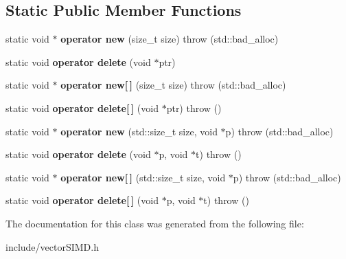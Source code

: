 \subsection*{Static Public Member Functions}
\begin{DoxyCompactItemize}
\item 
static void $\ast$ {\bfseries operator new} (size\+\_\+t size)  throw (std\+::bad\+\_\+alloc)\hypertarget{classirr_1_1vectorSIMD__32_ac2c4814f4eb148a1d2e183a49ad48ad5}{}\label{classirr_1_1vectorSIMD__32_ac2c4814f4eb148a1d2e183a49ad48ad5}

\item 
static void {\bfseries operator delete} (void $\ast$ptr)\hypertarget{classirr_1_1vectorSIMD__32_a81ff00e9b2272f5858f18e33ac8b9ce5}{}\label{classirr_1_1vectorSIMD__32_a81ff00e9b2272f5858f18e33ac8b9ce5}

\item 
static void $\ast$ {\bfseries operator new\mbox{[}$\,$\mbox{]}} (size\+\_\+t size)  throw (std\+::bad\+\_\+alloc)\hypertarget{classirr_1_1vectorSIMD__32_afa5efa80c3bb9ba2c14a90650ead879a}{}\label{classirr_1_1vectorSIMD__32_afa5efa80c3bb9ba2c14a90650ead879a}

\item 
static void {\bfseries operator delete\mbox{[}$\,$\mbox{]}} (void $\ast$ptr)  throw ()\hypertarget{classirr_1_1vectorSIMD__32_a72a9291aebc6a84f8a6895fa43eaef78}{}\label{classirr_1_1vectorSIMD__32_a72a9291aebc6a84f8a6895fa43eaef78}

\item 
static void $\ast$ {\bfseries operator new} (std\+::size\+\_\+t size, void $\ast$p)  throw (std\+::bad\+\_\+alloc)\hypertarget{classirr_1_1vectorSIMD__32_a87518dd22c99a94a59bee73916bc2db8}{}\label{classirr_1_1vectorSIMD__32_a87518dd22c99a94a59bee73916bc2db8}

\item 
static void {\bfseries operator delete} (void $\ast$p, void $\ast$t)  throw ()\hypertarget{classirr_1_1vectorSIMD__32_a06447e0f88ed49bf678551a7f0d1bf8b}{}\label{classirr_1_1vectorSIMD__32_a06447e0f88ed49bf678551a7f0d1bf8b}

\item 
static void $\ast$ {\bfseries operator new\mbox{[}$\,$\mbox{]}} (std\+::size\+\_\+t size, void $\ast$p)  throw (std\+::bad\+\_\+alloc)\hypertarget{classirr_1_1vectorSIMD__32_aa6cad6ffc6eb785db1526d07d1e3d5c3}{}\label{classirr_1_1vectorSIMD__32_aa6cad6ffc6eb785db1526d07d1e3d5c3}

\item 
static void {\bfseries operator delete\mbox{[}$\,$\mbox{]}} (void $\ast$p, void $\ast$t)  throw ()\hypertarget{classirr_1_1vectorSIMD__32_afaef82ecdf98763726424f5861692f51}{}\label{classirr_1_1vectorSIMD__32_afaef82ecdf98763726424f5861692f51}

\end{DoxyCompactItemize}


The documentation for this class was generated from the following file\+:\begin{DoxyCompactItemize}
\item 
include/vector\+S\+I\+M\+D.\+h\end{DoxyCompactItemize}
